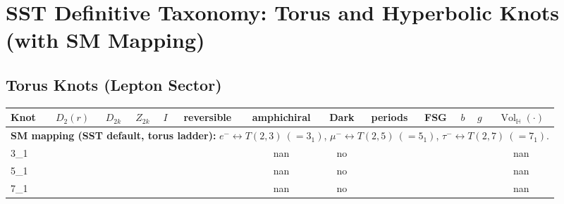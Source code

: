 \documentclass[a4paper,11pt]{article}
\newcommand{\VolH}[1]{\operatorname{Vol}_{\!\mathbb{H}}(#1)}
\begin{document}
\section*{SST Definitive Taxonomy: Torus and Hyperbolic Knots (with SM Mapping)}
\subsection*{Torus Knots (Lepton Sector)}
\begin{longtable}{lcccccccccccc}
\toprule
Knot & $D_2(r)$ & $D_{2k}$ & $Z_{2k}$ & $I$ & reversible & amphichiral & Dark & periods & FSG & $b$ & $g$ & $\VolH{\cdot}$ \\
\midrule
\multicolumn{13}{l}{\textbf{SM mapping (SST default, torus ladder):} $e^- \leftrightarrow T(2,3)\ (=3_1)$, $\mu^- \leftrightarrow T(2,5)\ (=5_1)$, $\tau^- \leftrightarrow T(2,7)\ (=7_1)$.} \\ \hline
3\_1 &  &  &  &  &  & nan & no &  &  &  &  & nan \\
5\_1 &  &  &  &  &  & nan & no &  &  &  &  & nan \\
7\_1 &  &  &  &  &  & nan & no &  &  &  &  & nan \\
\bottomrule
\end{longtable}
\end{document}
